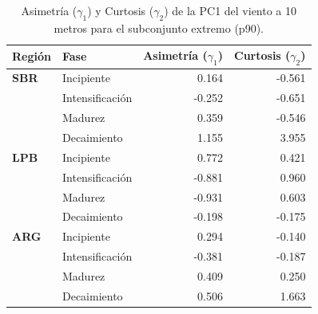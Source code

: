 \begin{table}[htbp]
\centering
\caption[Asimetría y Curtosis de la PC1 del viento a 10 m - Subconjunto p90]{Asimetría ($\gamma_1$) y Curtosis ($\gamma_2$) de la PC1 del viento a 10 metros para el subconjunto extremo (p90).}
\label{tab:momentos_p90_w10}
\begin{tabular*}{\textwidth}{@{\extracolsep{\fill}}llrr}
\hline
\textbf{Región} & \textbf{Fase} & \textbf{Asimetría ($\gamma_1$)} & \textbf{Curtosis ($\gamma_2$)} \\
\hline
\textbf{SBR} & Incipiente & 0.164 & -0.561 \\
 & Intensificación & -0.252 & -0.651 \\
 & Madurez & 0.359 & -0.546 \\
 & Decaimiento & 1.155 & 3.955 \\
\hline
\textbf{LPB} & Incipiente & 0.772 & 0.421 \\
 & Intensificación & -0.881 & 0.960 \\
 & Madurez & -0.931 & 0.603 \\
 & Decaimiento & -0.198 & -0.175 \\
\hline
\textbf{ARG} & Incipiente & 0.294 & -0.140 \\
 & Intensificación & -0.381 & -0.187 \\
 & Madurez & 0.409 & 0.250 \\
 & Decaimiento & 0.506 & 1.663 \\
\hline
\end{tabular*}
\end{table}